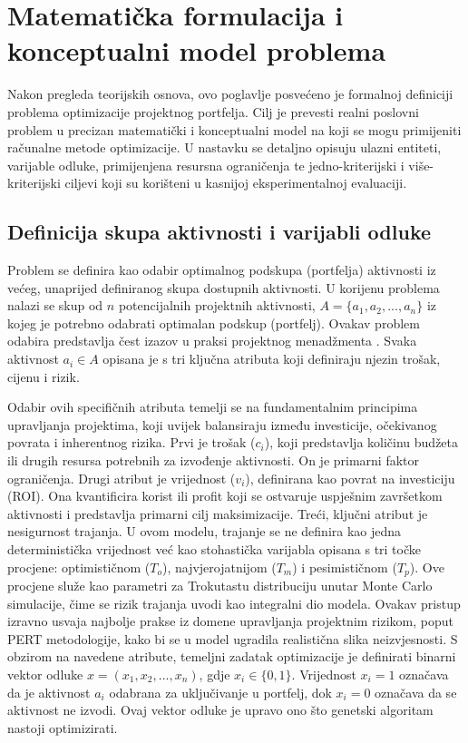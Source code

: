 \section{Matematička formulacija i konceptualni model problema}
\label{chap:model_problema}
Nakon pregleda teorijskih osnova, ovo poglavlje posvećeno je formalnoj definiciji problema optimizacije projektnog portfelja. Cilj je prevesti realni poslovni problem u precizan matematički i konceptualni model na koji se mogu primijeniti računalne metode optimizacije. U nastavku se detaljno opisuju ulazni entiteti, varijable odluke, primijenjena resursna ograničenja te jedno-kriterijski i više-kriterijski ciljevi koji su korišteni u kasnijoj eksperimentalnoj evaluaciji.
\subsection{Definicija skupa aktivnosti i varijabli odluke}
Problem se definira kao odabir optimalnog podskupa (portfelja) aktivnosti iz većeg, unaprijed definiranog skupa dostupnih aktivnosti. U korijenu problema nalazi se skup od $n$ potencijalnih projektnih aktivnosti, $A=\{a_1, a_2, ..., a_n\}$ iz kojeg je potrebno odabrati optimalan podskup (portfelj). Ovakav problem odabira predstavlja čest izazov u praksi projektnog menadžmenta \cite{PMI2021, Kerzner2017}.  Svaka aktivnost $a_i \in A$ opisana je s tri ključna atributa koji definiraju njezin trošak, cijenu i rizik.

 Odabir ovih specifičnih atributa temelji se na fundamentalnim principima upravljanja projektima, koji uvijek balansiraju između investicije, očekivanog povrata i inherentnog rizika. Prvi je trošak ($c_i$), koji predstavlja količinu budžeta ili drugih resursa potrebnih za izvođenje aktivnosti. On je primarni faktor ograničenja. Drugi atribut je vrijednost ($v_i$), definirana kao povrat na investiciju (ROI).  Ona kvantificira korist ili profit koji se ostvaruje uspješnim završetkom aktivnosti i predstavlja primarni cilj maksimizacije. Treći, ključni atribut je nesigurnost trajanja. U ovom modelu, trajanje se ne definira kao jedna deterministička vrijednost već kao stohastička varijabla opisana s tri točke procjene: optimističnom ($T_o$), najvjerojatnijom ($T_m$) i pesimističnom ($T_p$). Ove procjene služe kao parametri za Trokutastu distribuciju unutar Monte Carlo simulacije, čime se rizik trajanja uvodi kao integralni dio modela. Ovakav pristup izravno usvaja najbolje prakse iz domene upravljanja projektnim rizikom, poput PERT metodologije, kako bi se u model ugradila realistična slika neizvjesnosti.
S obzirom na navedene atribute, temeljni zadatak optimizacije je definirati binarni vektor odluke $x=(x_1, x_2, ..., x_n)$, gdje $x_i \in \{0,1\}$. Vrijednost $x_i=1$ označava da je aktivnost $a_i$ odabrana za uključivanje u portfelj, dok $x_i=0$ označava da se aktivnost ne izvodi. Ovaj vektor odluke je upravo ono što genetski algoritam nastoji optimizirati.


